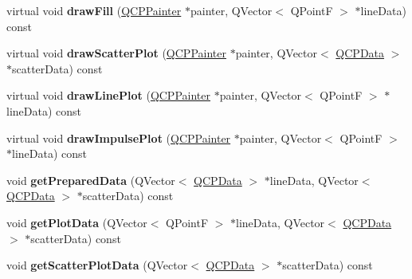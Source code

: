 \begin{DoxyCompactItemize}
\item 
\mbox{\label{class_q_c_p_graph_a9e6ce6db9aa7b29fc397c724fcf7b126}} 
virtual void {\bfseries draw\+Fill} (\mbox{\hyperlink{class_q_c_p_painter}{Q\+C\+P\+Painter}} $\ast$painter, Q\+Vector$<$ Q\+PointF $>$ $\ast$line\+Data) const
\item 
\mbox{\label{class_q_c_p_graph_ae1f3edd5eb41aa5782e61673488fd3e0}} 
virtual void {\bfseries draw\+Scatter\+Plot} (\mbox{\hyperlink{class_q_c_p_painter}{Q\+C\+P\+Painter}} $\ast$painter, Q\+Vector$<$ \mbox{\hyperlink{class_q_c_p_data}{Q\+C\+P\+Data}} $>$ $\ast$scatter\+Data) const
\item 
\mbox{\label{class_q_c_p_graph_af460db06d4d6466806721fe101f512e3}} 
virtual void {\bfseries draw\+Line\+Plot} (\mbox{\hyperlink{class_q_c_p_painter}{Q\+C\+P\+Painter}} $\ast$painter, Q\+Vector$<$ Q\+PointF $>$ $\ast$line\+Data) const
\item 
\mbox{\label{class_q_c_p_graph_ac62c84f51d85b78ee583455b8c37ba56}} 
virtual void {\bfseries draw\+Impulse\+Plot} (\mbox{\hyperlink{class_q_c_p_painter}{Q\+C\+P\+Painter}} $\ast$painter, Q\+Vector$<$ Q\+PointF $>$ $\ast$line\+Data) const
\item 
\mbox{\label{class_q_c_p_graph_ae853c297da9d21b6720d2d1c3b0121bf}} 
void {\bfseries get\+Prepared\+Data} (Q\+Vector$<$ \mbox{\hyperlink{class_q_c_p_data}{Q\+C\+P\+Data}} $>$ $\ast$line\+Data, Q\+Vector$<$ \mbox{\hyperlink{class_q_c_p_data}{Q\+C\+P\+Data}} $>$ $\ast$scatter\+Data) const
\item 
\mbox{\label{class_q_c_p_graph_a5ec495f97b8185ba9712430cb1558f52}} 
void {\bfseries get\+Plot\+Data} (Q\+Vector$<$ Q\+PointF $>$ $\ast$line\+Data, Q\+Vector$<$ \mbox{\hyperlink{class_q_c_p_data}{Q\+C\+P\+Data}} $>$ $\ast$scatter\+Data) const
\item 
\mbox{\label{class_q_c_p_graph_a6ea929da420e6c104998060d19740ed6}} 
void {\bfseries get\+Scatter\+Plot\+Data} (Q\+Vector$<$ \mbox{\hyperlink{class_q_c_p_data}{Q\+C\+P\+Data}} $>$ $\ast$scatter\+Data) const
\item 
\mbox{\label{class_q_c_p_graph_a77314984a7af578a66e939db0db48556}} 

\end{DoxyCompactItemize}

